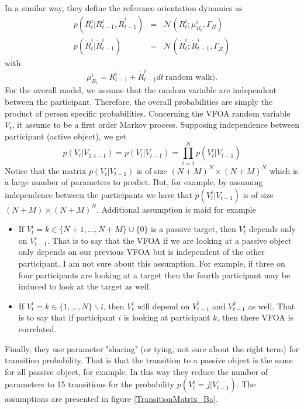 \documentclass[11pt,a4paper]{article}
\begin{document}
In a similar way, they define the reference orientation dynamics as
\begin{equation}
\begin{array}{rcl}
p(R_t^i | R_{t-1}^i,\dot{R}_{t-1}^i) &=& \mathcal{N}(R_t^i; \mu_{R_t}^{i}, \Gamma_R) \\
p(\dot{R}_t^i | \dot{R}_{t-1}^i) &=& \mathcal{N}(\dot{R}_{t}^i; \dot{R}_{t-1}^i, \Gamma_{\dot{R}})
\end{array}
\end{equation}
with 
\begin{equation}
\mu_{R_t}^i = R_{t-1}^i + \dot{R}_{t-1}^i dt ~\text{random walk)}.
\end{equation}
For the overall model, we assume that the random variable are independent between the participant. Therefore, the overall probabilities are simply the product of person specific probabilities. Concerning the VFOA random variable $V_t$, it assume to be a first order Markov process. Supposing independence between participant (active object), we get
\begin{equation}
p(V_t | V_{1:{t-1}}) = p(V_t | V_{t-1}) = \prod_{i=1}^N p(V_t^i | V_{t-1})
\end{equation}
Notice that the matrix $p(V_t | V_{t-1})$ is of size $(N+M)^N \times (N+M)^N$ which is a large number of parameters to predict. But, for example, by assuming independence between the participants we have that $p(V_t^i | V_{t-1})$ is of size $(N+M) \times (N+M)^N$. Additional assumption is maid for example
\begin{itemize}
\item If $V_t^i = k \in \{N+1,...,N+M\}\cup \{0\}$ is a passive target, then $V_t^i$ depends only on $V_{t-1}^i$. That is to say that the VFOA if we are looking at a passive object only depends on our previous VFOA but is independent of the other participant. I am not sure about this assumption. For example, if three on four participants are looking at a target then the fourth participant may be induced to look at the target as well.
\item If $V_t^i = k \in \{1,...,N\}\backslash{i}$, then $V_t^i$ will depend on $V_{t-1}^i$ and $V_{t-1}^k$ as well. That is to say that if participant $i$ is looking at participant $k$, then there VFOA is correlated.
\end{itemize}
Finally, they use parameter "sharing" (or tying, not sure about the right term) for transition probability. That is that the transition to a passive object is the same for all passive object, for example. In this way they reduce the number of parameters to 15 transitions for the probability $p(V_t^i = j | V_{t-1})$. The assumptions are presented in figure \ref{TransitionMatrix_Ba}.
\end{document}
